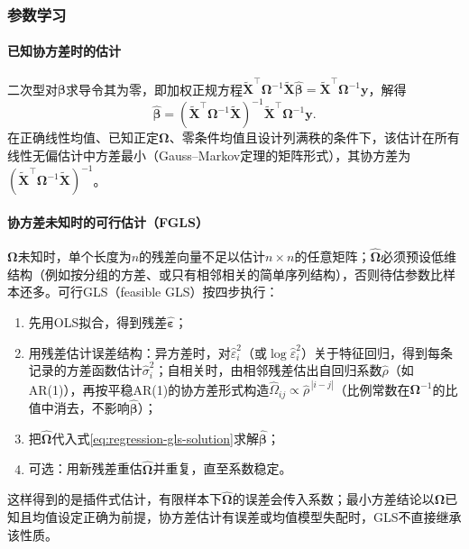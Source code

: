 \subsubsection{参数学习}
\label{sec:regression-gls-learning}

\paragraph{已知协方差时的估计}

二次型对$\bm\beta$求导令其为零，即加权正规方程$\widetilde{\bm X}^{\top}\bm{\Omega}^{-1}\widetilde{\bm X}\widehat{\bm\beta}=\widetilde{\bm X}^{\top}\bm{\Omega}^{-1}\bm{y}$，解得
\begin{equation}
  \widehat{\bm\beta}
  =(\widetilde{\bm X}^{\top}\bm{\Omega}^{-1}\widetilde{\bm X})^{-1}
    \widetilde{\bm X}^{\top}\bm{\Omega}^{-1}\bm{y}.
  \label{eq:regression-gls-solution}
\end{equation}
在正确线性均值、已知正定$\bm{\Omega}$、零条件均值且设计列满秩的条件下，该估计在所有线性无偏估计中方差最小（Gauss--Markov定理的矩阵形式），其协方差为$(\widetilde{\bm X}^{\top}\bm{\Omega}^{-1}\widetilde{\bm X})^{-1}$。

\paragraph{协方差未知时的可行估计（FGLS）}

$\bm{\Omega}$未知时，单个长度为$n$的残差向量不足以估计$n\times n$的任意矩阵；$\widehat{\bm\Omega}$必须预设低维结构（例如按分组的方差、或只有相邻相关的简单序列结构），否则待估参数比样本还多。可行GLS（feasible GLS）按四步执行：

\begin{enumerate}
  \item 先用OLS拟合，得到残差$\widehat{\bm\varepsilon}$；
  \item 用残差估计误差结构：异方差时，对$\widehat{\varepsilon}_i^2$（或$\log\widehat{\varepsilon}_i^2$）关于特征回归，得到每条记录的方差函数估计$\widehat{\sigma}_i^2$；自相关时，由相邻残差估出自回归系数$\widehat\rho$（如AR(1)），再按平稳AR(1)的协方差形式构造$\widehat{\Omega}_{ij}\propto\widehat\rho^{\,|i-j|}$（比例常数在$\bm\Omega^{-1}$的比值中消去，不影响$\widehat{\bm\beta}$）；
  \item 把$\widehat{\bm{\Omega}}$代入式\eqref{eq:regression-gls-solution}求解$\widehat{\bm\beta}$；
  \item 可选：用新残差重估$\widehat{\bm{\Omega}}$并重复，直至系数稳定。
\end{enumerate}
这样得到的是插件式估计，有限样本下$\widehat{\bm{\Omega}}$的误差会传入系数；最小方差结论以$\bm{\Omega}$已知且均值设定正确为前提，协方差估计有误差或均值模型失配时，GLS不直接继承该性质。
